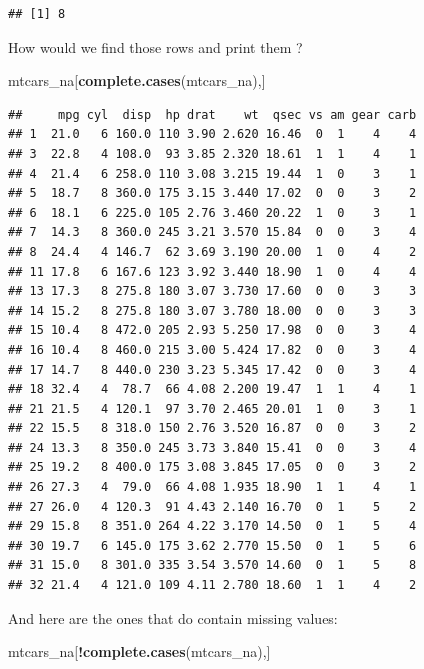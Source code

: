 \documentclass[]{book}
\newenvironment{Shaded}{\begin{snugshade}}{\end{snugshade}}
\newcommand{\KeywordTok}[1]{\textcolor[rgb]{0.13,0.29,0.53}{\textbf{#1}}}
\newcommand{\NormalTok}[1]{#1}
\newcommand{\OperatorTok}[1]{\textcolor[rgb]{0.81,0.36,0.00}{\textbf{#1}}}
\begin{document}
\begin{verbatim}
## [1] 8
\end{verbatim}

How would we find those rows and print them ?

\begin{Shaded}
\begin{Highlighting}[]
\NormalTok{mtcars_na[}\KeywordTok{complete.cases}\NormalTok{(mtcars_na),]}
\end{Highlighting}
\end{Shaded}

\begin{verbatim}
##     mpg cyl  disp  hp drat    wt  qsec vs am gear carb
## 1  21.0   6 160.0 110 3.90 2.620 16.46  0  1    4    4
## 3  22.8   4 108.0  93 3.85 2.320 18.61  1  1    4    1
## 4  21.4   6 258.0 110 3.08 3.215 19.44  1  0    3    1
## 5  18.7   8 360.0 175 3.15 3.440 17.02  0  0    3    2
## 6  18.1   6 225.0 105 2.76 3.460 20.22  1  0    3    1
## 7  14.3   8 360.0 245 3.21 3.570 15.84  0  0    3    4
## 8  24.4   4 146.7  62 3.69 3.190 20.00  1  0    4    2
## 11 17.8   6 167.6 123 3.92 3.440 18.90  1  0    4    4
## 13 17.3   8 275.8 180 3.07 3.730 17.60  0  0    3    3
## 14 15.2   8 275.8 180 3.07 3.780 18.00  0  0    3    3
## 15 10.4   8 472.0 205 2.93 5.250 17.98  0  0    3    4
## 16 10.4   8 460.0 215 3.00 5.424 17.82  0  0    3    4
## 17 14.7   8 440.0 230 3.23 5.345 17.42  0  0    3    4
## 18 32.4   4  78.7  66 4.08 2.200 19.47  1  1    4    1
## 21 21.5   4 120.1  97 3.70 2.465 20.01  1  0    3    1
## 22 15.5   8 318.0 150 2.76 3.520 16.87  0  0    3    2
## 24 13.3   8 350.0 245 3.73 3.840 15.41  0  0    3    4
## 25 19.2   8 400.0 175 3.08 3.845 17.05  0  0    3    2
## 26 27.3   4  79.0  66 4.08 1.935 18.90  1  1    4    1
## 27 26.0   4 120.3  91 4.43 2.140 16.70  0  1    5    2
## 29 15.8   8 351.0 264 4.22 3.170 14.50  0  1    5    4
## 30 19.7   6 145.0 175 3.62 2.770 15.50  0  1    5    6
## 31 15.0   8 301.0 335 3.54 3.570 14.60  0  1    5    8
## 32 21.4   4 121.0 109 4.11 2.780 18.60  1  1    4    2
\end{verbatim}

And here are the ones that do contain missing values:

\begin{Shaded}
\begin{Highlighting}[]
\NormalTok{mtcars_na[}\OperatorTok{!}\KeywordTok{complete.cases}\NormalTok{(mtcars_na),]}
\end{Highlighting}
\end{Shaded}
\end{document}
